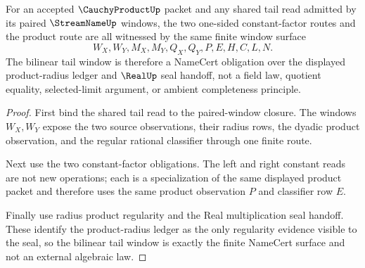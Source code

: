 \begin{theorem}
\label{thm:cauchy-product-bilinear-tail-window}
For an accepted $\CauchyProductUp$ packet and any shared tail read admitted by its paired $\StreamNameUp$ windows, the two one-sided constant-factor routes and the product route are all witnessed by the same finite window surface
$$
W_X,W_Y,M_X,M_Y,Q_X,Q_Y,P,E,H,C,L,N.
$$
The bilinear tail window is therefore a NameCert obligation over the displayed product-radius ledger and $\RealUp$ seal handoff, not a field law, quotient equality, selected-limit argument, or ambient completeness principle.
\end{theorem}
\begin{proof}
First bind the shared tail read to the paired-window closure. The windows $W_X,W_Y$ expose the two source observations, their radius rows, the dyadic product observation, and the regular rational classifier through one finite route.

Next use the two constant-factor obligations. The left and right constant reads are not new operations; each is a specialization of the same displayed product packet and therefore uses the same product observation $P$ and classifier row $E$.

Finally use radius product regularity and the Real multiplication seal handoff. These identify the product-radius ledger as the only regularity evidence visible to the seal, so the bilinear tail window is exactly the finite NameCert surface and not an external algebraic law.
\end{proof}

